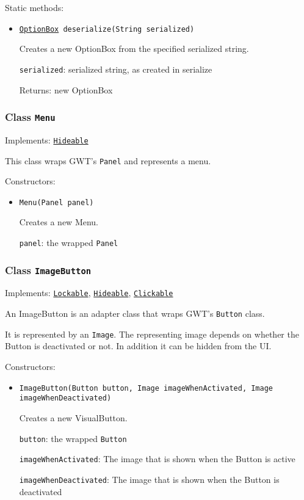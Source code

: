 Static methods:
\begin{itemize}
\item \texttt{\hyperref[type:edu.kit.wavelength.client.view.webui.component.OptionBox]{OptionBox} deserialize(String serialized)}

Creates a new OptionBox from the specified serialized string.

\texttt{serialized}: serialized string, as created in serialize

Returns: new OptionBox

\end{itemize}

\subsubsection{Class \texttt{Menu}}
\label{type:edu.kit.wavelength.client.view.webui.component.Menu}
Implements: \texttt{\hyperref[type:edu.kit.wavelength.client.view.api.Hideable]{Hideable}}

This class wraps GWT's \texttt{Panel} and represents a menu.

Constructors:
\begin{itemize}
\item \texttt{Menu(Panel panel)}

Creates a new Menu.

\texttt{panel}: the wrapped \texttt{Panel}

\end{itemize}

\subsubsection{Class \texttt{ImageButton}}
\label{type:edu.kit.wavelength.client.view.webui.component.ImageButton}
Implements: \texttt{\hyperref[type:edu.kit.wavelength.client.view.api.Lockable]{Lockable}}, \texttt{\hyperref[type:edu.kit.wavelength.client.view.api.Hideable]{Hideable}}, \texttt{\hyperref[type:edu.kit.wavelength.client.view.api.Clickable]{Clickable}}

An ImageButton is an adapter class that wraps GWT's \texttt{Button} class.

 It is represented by an \texttt{Image}. The representing image depends on whether the
 Button is deactivated or not. In addition it can be hidden from the UI.

Constructors:
\begin{itemize}
\item \texttt{ImageButton(Button button, Image imageWhenActivated, Image imageWhenDeactivated)}

Creates a new VisualButton.

\texttt{button}: the wrapped \texttt{Button}

\texttt{imageWhenActivated}: The image that is shown when the Button is active

\texttt{imageWhenDeactivated}: The image that is shown when the Button is deactivated

\end{itemize}

